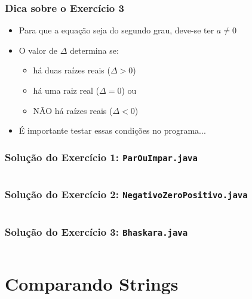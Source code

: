 \documentclass[xcolor={dvipsnames,table},aspectratio=169]{beamer}
\begin{document}
\begin{frame}\frametitle{Dica sobre o Exercício 3}
\begin{itemize}
	\item Para que a equação seja do segundo grau, deve-se ter $a\neq 0$
	\item O valor de $\Delta$ determina se:
	\begin{itemize}
		\item há duas raízes reais ($\Delta > 0$)
		\item há uma raiz real ($\Delta = 0$) ou
		\item NÃO há raízes reais ($\Delta < 0$)
	\end{itemize}
	\item É importante testar essas condições no programa...
\end{itemize}
\end{frame}
	
\begin{frame}\frametitle{Solução do Exercício 1: \texttt{ParOuImpar.java}}
	\scriptsize{\inputminted[bgcolor=cyan!10]{java}{src/ParOuImpar.java}}
\end{frame}

\begin{frame}\frametitle{Solução do Exercício 2: \texttt{NegativoZeroPositivo.java}}
	\tiny{\inputminted[bgcolor=cyan!10]{java}{src/NegativoZeroPositivo.java}}
\end{frame}

\begin{frame}\frametitle{Solução do Exercício 3: \texttt{Bhaskara.java}}
	\tiny{\inputminted[bgcolor=cyan!10]{java}{src/Bhaskara.java}}
\end{frame}

\section{Comparando Strings}
\end{document}
